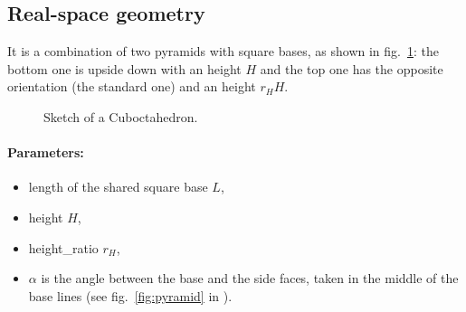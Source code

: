 \subsection{Real-space geometry}
It is a combination of two pyramids with square bases, as shown in fig.~\ref{fig:cuboctahedron}: the bottom one
is upside down with an height $H$ and the top one has the opposite
orientation (the standard one) and an height $r_H H$.

\begin{figure}[ht]
\hfill
{}
\hfill
{}
\hfill
\caption{Sketch of a Cuboctahedron.}
\label{fig:cuboctahedron}
\end{figure}

\FloatBarrier

\paragraph{Parameters:}
\begin{itemize}
\item length of the shared square base $L$,
\item height $H$,
\item height\_ratio $r_H$,
\item $\alpha$ is the angle between the base and the
  side faces, taken in the middle of the base lines (see
  fig.~\ref{fig:pyramid} in ).
\end{itemize}

